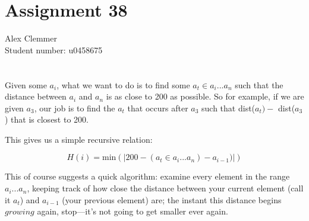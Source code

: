 \documentclass[a4paper]{article}
\begin{document}
\section*{Assignment 38}
Alex Clemmer\\
Student number: u0458675

\section{}

Given some $a_i$, what we want to do is to find some $a_t \in a_i...a_n$ such that the distance between $a_i$ and $a_n$ is as close to 200 as possible. So for example, if we are given $a_3$, our job is to find the $a_t$ that occurs after $a_3$ such that dist($a_t ) - $ dist($a_3$) that is closest to 200.

This gives us a simple recursive relation:

\begin{equation}
H(i) = \mbox{min}(|200-(a_t \in a_i ... a_n) - a_{i-1})|)
\end{equation}

This of course suggests a quick algorithm: examine every element in the range $a_i...a_n$, keeping track of how close the distance between your current element (call it $a_t$) and $a_{i-1}$ (your previous element) are; the instant this distance begins $\textit{growing}$ again, stop---it's not going to get smaller ever again.
\end{document}
